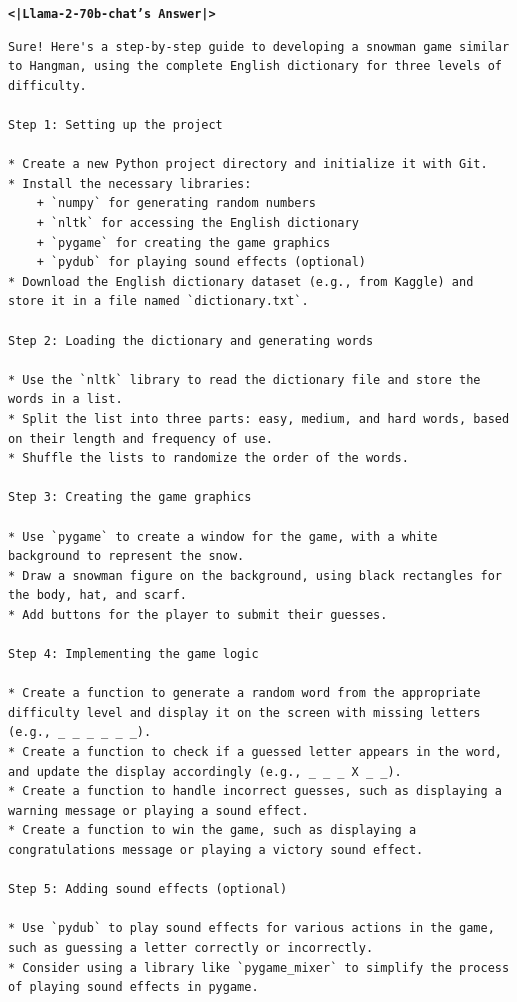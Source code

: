 \documentclass{article}
\begin{document}
\begin{tcolorbox}
\texttt{\textbf{<|Llama-2-70b-chat's Answer|>}} 
    \begin{lstlisting}
Sure! Here's a step-by-step guide to developing a snowman game similar to Hangman, using the complete English dictionary for three levels of difficulty.

Step 1: Setting up the project

* Create a new Python project directory and initialize it with Git.
* Install the necessary libraries:
	+ `numpy` for generating random numbers
	+ `nltk` for accessing the English dictionary
	+ `pygame` for creating the game graphics
	+ `pydub` for playing sound effects (optional)
* Download the English dictionary dataset (e.g., from Kaggle) and store it in a file named `dictionary.txt`.

Step 2: Loading the dictionary and generating words

* Use the `nltk` library to read the dictionary file and store the words in a list.
* Split the list into three parts: easy, medium, and hard words, based on their length and frequency of use.
* Shuffle the lists to randomize the order of the words.

Step 3: Creating the game graphics

* Use `pygame` to create a window for the game, with a white background to represent the snow.
* Draw a snowman figure on the background, using black rectangles for the body, hat, and scarf.
* Add buttons for the player to submit their guesses.

Step 4: Implementing the game logic

* Create a function to generate a random word from the appropriate difficulty level and display it on the screen with missing letters (e.g., _ _ _ _ _ _).
* Create a function to check if a guessed letter appears in the word, and update the display accordingly (e.g., _ _ _ X _ _).
* Create a function to handle incorrect guesses, such as displaying a warning message or playing a sound effect.
* Create a function to win the game, such as displaying a congratulations message or playing a victory sound effect.

Step 5: Adding sound effects (optional)

* Use `pydub` to play sound effects for various actions in the game, such as guessing a letter correctly or incorrectly.
* Consider using a library like `pygame_mixer` to simplify the process of playing sound effects in pygame.
    \end{lstlisting}
\end{tcolorbox}
\end{document}
